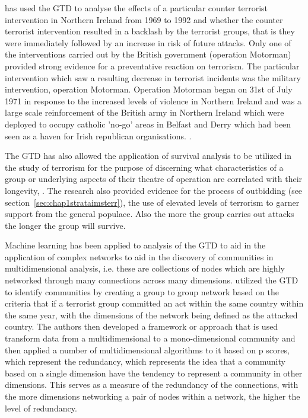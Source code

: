 \citep{lafree2009impact} has used the GTD to analyse the effects of a particular counter terrorist intervention in Northern Ireland from 1969 to 1992 and whether the counter terrorist intervention resulted in a backlash by the terrorist groups, that is they were immediately followed by an increase in risk of future attacks. Only one of the interventions carried out by the British government (operation Motorman) provided strong evidence for a preventative reaction on  terrorism. The particular intervention which saw a resulting decrease in terrorist incidents was the military intervention, operation Motorman. 
Operation Motorman began on  31st of July 1971 in response to the increased levels of violence in Northern Ireland \citep{edwards2011northern} and was a large scale reinforcement of the British army in Northern Ireland which were deployed to occupy catholic 'no-go' areas in Belfast and Derry which had been seen as a haven for Irish republican organisations. \citep{neumann2003myth}.

The GTD has also allowed the application of survival analysis to be utilized in the study of terrorism for the purpose of discerning what characteristics of a group or underlying aspects of their theatre of operation are correlated with their longevity, \citep{young2014survival}. The  research also provided evidence for the  process of outbidding (see section~\ref{sec:chap1strataimsterr}),  the use of elevated levels of terrorism to garner support from the general populace. Also the more the group carries out attacks the longer the group will survive.

Machine learning has been applied to analysis of the GTD to aid in the application of complex networks to aid in the discovery of communities in multidimensional analysis, i.e. these are collections of nodes which are highly networked through many connections across many dimensions. \citep{berlingerio2011finding} utilized the GTD to identify communities by creating a group to group network based on the criteria that if a terrorist group committed an act within the same country within the same year, with the dimensions of the network being defined as the attacked country. The authors then developed a framework or approach that is used transform data from a multidimensional to a mono-dimensional community and then applied a number of multidimensional algorithms to it based on p scores, which represent the redundancy, which represents the idea that a community based on a single dimension have the tendency to represent a community in other dimensions. This serves as a measure of the redundancy of the connections, with the more dimensions networking a pair of nodes within a network, the higher the level of redundancy. 

